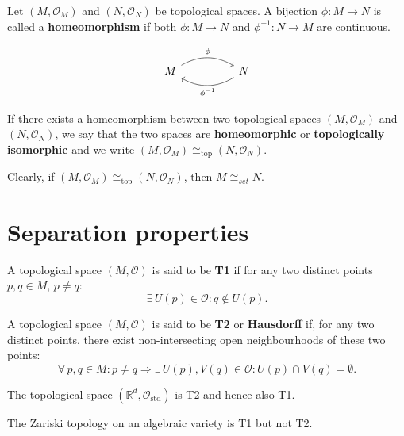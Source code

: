 \documentclass[root.tex]{subfiles}
\begin{document}
\begin{mydef}
Let $(M,\mathcal{O}_M)$ and $(N,\mathcal{O}_N)$ be topological spaces. A bijection $\phi: M\to N$ is called a \textbf{homeomorphism} if both $\phi: M\to N$ and $\phi^{-1}: N\to M$ are continuous.
\end{mydef}

$$
\begin{tikzcd}
M \arrow[rr, bend left,"\phi"] & & N \arrow[ll, bend left,"\phi^{-1}"]
\end{tikzcd}
$$

\begin{mydef}
If there exists a homeomorphism between two topological spaces $(M,\mathcal{O}_M)$ and $(N,\mathcal{O}_N)$, we say that the two spaces are \textbf{homeomorphic} or \textbf{topologically isomorphic} and we write $(M,\mathcal{O}_M) \cong_\mathrm{top} (N,\mathcal{O}_N)$.
\end{mydef}

Clearly, if $(M,\mathcal{O}_M) \cong_\mathrm{top} (N,\mathcal{O}_N)$, then $M \cong_{set} N$.

\section{Separation properties}
%
\begin{mydef}
  A topological space $(M,\mathcal{O})$ is said to be \textbf{T1} if for any two distinct points $p,q\in M$, $p\neq q$:
$$
\exists \, U(p) \in \mathcal{O} : q \notin U(p).
$$
\end{mydef}

\begin{mydef}
A topological space $(M,\mathcal{O})$ is said to be \textbf{T2} or \textbf{Hausdorff} if, for any two distinct points, there exist non-intersecting open neighbourhoods of these two points:
$$
\forall \, p,q\in M : p\neq q \Rightarrow \exists \, U(p),V(q)\in \mathcal{O} : U(p)\cap V(q) = \emptyset.
$$
\end{mydef}
%
\begin{myex}
  The topological space $(\mathbb{R}^d,\mathcal{O}_\mathrm{std})$ is T2 and hence also T1.
\end{myex}

\begin{myex}
The Zariski topology on an algebraic variety is T1 but not T2.
\end{myex}
\end{document}
